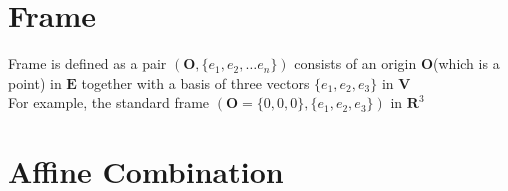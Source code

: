 \documentclass[UTF8]{article}
\begin{document}
\section{Frame}
Frame is defined as a pair 
$(\mathbf{O}, \{e_1, e_2, \dots e_n\})$ consists of an origin $\mathbf{O}$(which is a point) in $\mathbf{E}$ together with a basis of three vectors $\{e_1, e_2, e_3\}$ in $\mathbf{V}$ \\
For example, the standard frame 
$(\mathbf{O} = \{0, 0, 0\}, \{e_1, e_2, e_3\})$ in $\mathbf{R}^3$
\section{Affine Combination}
%
%
\end{document}

